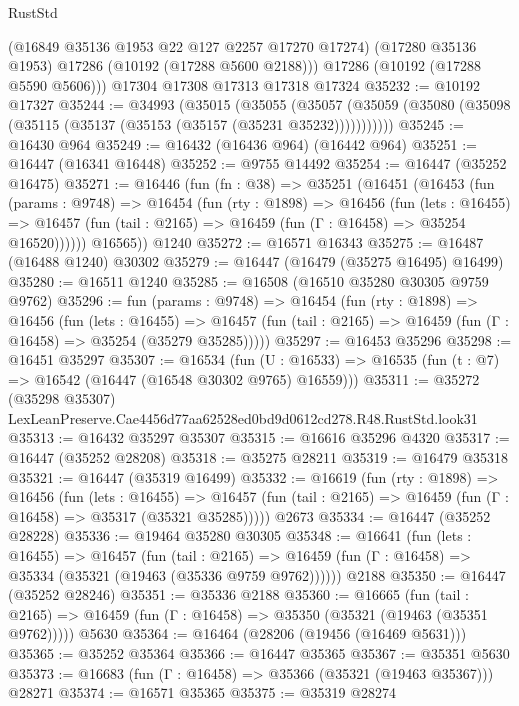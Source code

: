 \begin{lexlean}{RustStd}
\begin{coremodule}
        (@16849 @35136 @1953 @22 @127 @2257 @17270 @17274)
        (@17280 @35136 @1953)
        @17286
        (@10192 (@17288 @5600 @2188)))
      @17286
      (@10192 (@17288 @5590 @5606)))
    @17304
    @17308
    @17313
    @17318
    @17324
@35232 := @10192 @17327
@35244 := @34993
    (@35015
      (@35055
        (@35057 (@35059 (@35080 (@35098 (@35115 (@35137 (@35153 (@35157 (@35231 @35232)))))))))))
@35245 := @16430 @964
@35249 := @16432 (@16436 @964) (@16442 @964)
@35251 := @16447 (@16341 @16448)
@35252 := @9755 @14492
@35254 := @16447 (@35252 @16475)
@35271 := @16446
    (fun (fn : @38) =>
    @35251
      (@16451
        (@16453
          (fun (params : @9748) =>
          @16454
            (fun (rty : @1898) =>
            @16456
              (fun (lets : @16455) =>
              @16457 (fun (tail : @2165) => @16459 (fun (Γ : @16458) => @35254 @16520))))))
        @16565))
    @1240
@35272 := @16571 @16343
@35275 := @16487 (@16488 @1240) @30302
@35279 := @16447 (@16479 (@35275 @16495) @16499)
@35280 := @16511 @1240
@35285 := @16508 (@16510 @35280 @30305 @9759 @9762)
@35296 := fun (params : @9748) =>
  @16454
    (fun (rty : @1898) =>
    @16456
      (fun (lets : @16455) =>
      @16457 (fun (tail : @2165) => @16459 (fun (Γ : @16458) => @35254 (@35279 @35285)))))
@35297 := @16453 @35296
@35298 := @16451 @35297
@35307 := @16534
    (fun (U : @16533) => @16535 (fun (t : @7) => @16542 (@16447 (@16548 @30302 @9765) @16559)))
@35311 := @35272
    (@35298 @35307)
    LexLeanPreserve.Cae4456d77aa62528ed0bd9d0612cd278.R48.RustStd.look31
@35313 := @16432 @35297 @35307
@35315 := @16616 @35296 @4320
@35317 := @16447 (@35252 @28208)
@35318 := @35275 @28211
@35319 := @16479 @35318
@35321 := @16447 (@35319 @16499)
@35332 := @16619
    (fun (rty : @1898) =>
    @16456
      (fun (lets : @16455) =>
      @16457 (fun (tail : @2165) => @16459 (fun (Γ : @16458) => @35317 (@35321 @35285)))))
    @2673
@35334 := @16447 (@35252 @28228)
@35336 := @19464 @35280 @30305
@35348 := @16641
    (fun (lets : @16455) =>
    @16457
      (fun (tail : @2165) =>
      @16459 (fun (Γ : @16458) => @35334 (@35321 (@19463 (@35336 @9759 @9762))))))
    @2188
@35350 := @16447 (@35252 @28246)
@35351 := @35336 @2188
@35360 := @16665
    (fun (tail : @2165) => @16459 (fun (Γ : @16458) => @35350 (@35321 (@19463 (@35351 @9762)))))
    @5630
@35364 := @16464 (@28206 (@19456 (@16469 @5631)))
@35365 := @35252 @35364
@35366 := @16447 @35365
@35367 := @35351 @5630
@35373 := @16683 (fun (Γ : @16458) => @35366 (@35321 (@19463 @35367))) @28271
@35374 := @16571 @35365
@35375 := @35319 @28274

\end{coremodule}
\end{lexlean}
